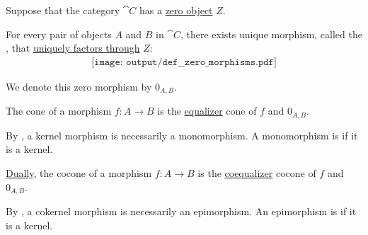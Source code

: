 \begin{definition}\label{def:zero_morphisms}
  Suppose that the category \( \cat{C} \) has a \hyperref[def:universal_objects/zero]{zero object} \( Z \).

  \begin{thmenum}
     For every pair of objects \( A \) and \( B \) in \( \cat{C} \), there exists unique morphism, called the , that \hyperref[def:factors_through]{uniquely factors through} \( Z \):
    \begin{equation}\label{eq:def:zero_morphisms/morphism}
      \begin{aligned}
        \texttt{[image: output/def\_\_zero\_morphisms.pdf]}
      \end{aligned}
    \end{equation}

    We denote this zero morphism by \( 0_{A,B} \).

     The  cone of a morphism \( f: A \to B \) is the \hyperref[eq:def:equalizers/equalizer]{equalizer} cone of \( f \) and \( 0_{A,B} \).

    By , a kernel morphism is necessarily a monomorphism. A monomorphism is  if it is a kernel.

     \hyperref[thm:categorical_principle_of_duality]{Dually}, the  cocone of a morphism \( f: A \to B \) is the \hyperref[eq:def:equalizers/coequalizer]{coequalizer} cocone of \( f \) and \( 0_{A,B} \).

    By , a cokernel morphism is necessarily an epimorphism. An epimorphism is  if it is a kernel.
  \end{thmenum}
\end{definition}

